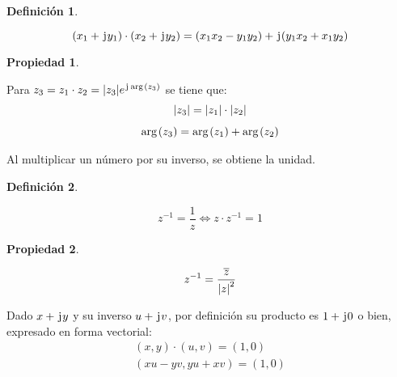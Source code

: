 \documentclass[a5paper,12pt,twoside]{book}
\newtheorem{defn}{{Definición}}[chapter]
\newtheorem{prop}{{Propiedad}}[chapter]
\begin{document}
\begin{mdframed}[style=DefinitionFrame]
    \begin{defn}
    \end{defn}
    \begin{equation*}
        (x_1 + \mkern2mu\mathrm{j}\mkern1mu y_1) \cdot (x_2 + \mkern2mu\mathrm{j}\mkern1mu y_2) = (x_1x_2-y_1y_2) + \mkern2mu\mathrm{j}\mkern1mu (y_1x_2+x_1y_2)
    \end{equation*}
\end{mdframed}

\begin{mdframed}[style=PropertyFrame]
    \begin{prop}
    \end{prop}
    Para $z_3=z_1 \cdot z_2 = {\left| {z_3} \right|} e^{\mkern2mu\mathrm{j}\mkern1mu \mathop{\mathrm{arg}}\mkern2mu(z_3) } $ se tiene que:
    \begin{gather*}
        {\left| {z_3} \right|} = {\left| {z_1} \right|} \cdot {\left| {z_2} \right|}
        \\[1ex]
        \mathop{\mathrm{arg}}\mkern2mu(z_3) = \mathop{\mathrm{arg}}\mkern2mu(z_1) + \mathop{\mathrm{arg}}\mkern2mu(z_2)
    \end{gather*}
\end{mdframed}

Al multiplicar un número por su inverso, se obtiene la unidad.

\begin{mdframed}[style=DefinitionFrame]
    \begin{defn}
        \label{defn:Inverse}
    \end{defn}
    \begin{equation*}
        z^{-1}=\frac{1}{z} \iff z \cdot z^{-1} = 1
    \end{equation*}
\end{mdframed}

\begin{mdframed}[style=PropertyFrame]
    \begin{prop}
    \end{prop}
    \begin{equation*}
        z^{-1}=\dfrac{\overline{z}}{{\left| {z} \right|}^2}
    \end{equation*}
\end{mdframed}


Dado $x + \mkern2mu\mathrm{j}\mkern1mu y$ y su inverso $u + \mkern2mu\mathrm{j}\mkern1mu v$, por definición su producto es $1 + \mkern2mu\mathrm{j}\mkern1mu 0$ o bien, expresado en forma vectorial:
\begin{gather*}
    (x,y) \cdot (u,v) = (1,0)
    \\
    (xu-yv,yu+xv) = (1,0)
\end{gather*}
\end{document}
